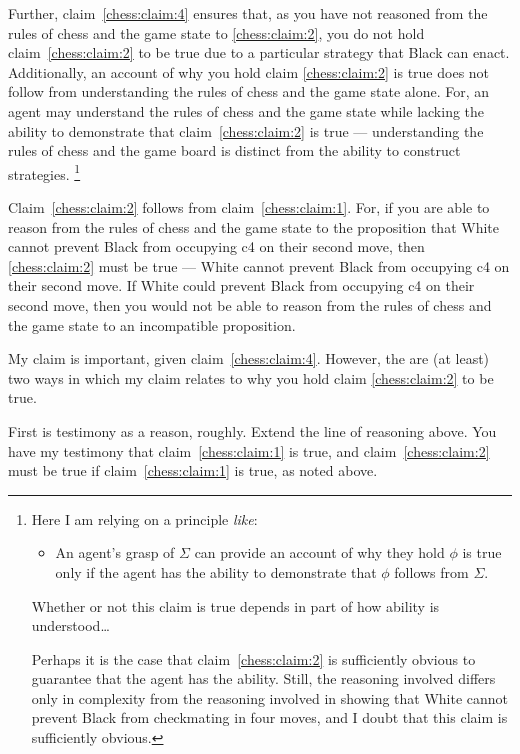 \documentclass[10pt]{article}
\begin{document}
Further, claim~\ref{chess:claim:4} ensures that, as you have not reasoned from the rules of chess and the game state to \ref{chess:claim:2}, you do not hold claim~\ref{chess:claim:2} to be true due to a particular strategy that Black can enact.
Additionally, an account of why you hold claim \ref{chess:claim:2} is true does not follow from understanding the rules of chess and the game state alone.
For, an agent may understand the rules of chess and the game state while lacking the ability to demonstrate that claim~\ref{chess:claim:2} is true --- understanding the rules of chess and the game board is distinct from the ability to construct strategies.\nolinebreak
\footnote{
  Here I am relying on a principle \emph{like}:
  \begin{itemize}
  \item An agent's grasp of \(\Sigma\) can provide an account of why they hold \(\phi\) is true only if the agent has the ability to demonstrate that \(\phi\) follows from \(\Sigma\).
  \end{itemize}
  {
    \color{red}
    Whether or not this claim is true depends in part of how ability is understood\dots
  }

  Perhaps it is the case that claim~\ref{chess:claim:2} is sufficiently obvious to guarantee that the agent has the ability.
  Still, the reasoning involved differs only in complexity from the reasoning involved in showing that White cannot prevent Black from checkmating in four moves, and I doubt that this claim is sufficiently obvious.
}

Claim~\ref{chess:claim:2} follows from claim~\ref{chess:claim:1}.
For, if you are able to reason from the rules of chess and the game state to the proposition that White cannot prevent Black from occupying c4 on their second move, then \ref{chess:claim:2} must be true --- White cannot prevent Black from occupying c4 on their second move.
If White could prevent Black from occupying c4 on their second move, then you would not be able to reason from the rules of chess and the game state to an incompatible proposition.

My claim is important, given claim~\ref{chess:claim:4}.
However, the are (at least) two ways in which my claim relates to why you hold claim \ref{chess:claim:2} to be true.

First is testimony as a reason, roughly.
Extend the line of reasoning above.
You have my testimony that claim~\ref{chess:claim:1} is true, and claim~\ref{chess:claim:2} must be true if claim~\ref{chess:claim:1} is true, as noted above.
\end{document}
